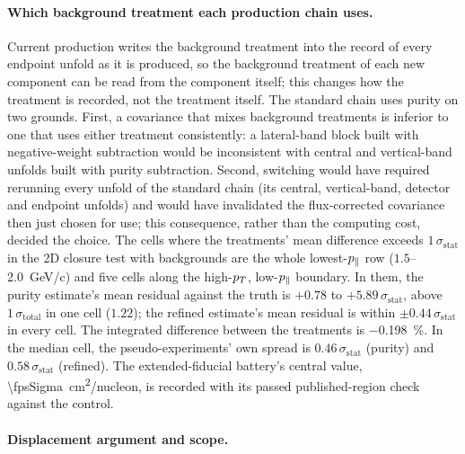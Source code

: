 \paragraph{Which background treatment each production chain uses.} Current production writes the background treatment into the record of every endpoint unfold as it is produced, so the background treatment of each new component can be read from the component itself; this changes how the treatment is recorded, not the treatment itself. The standard chain uses purity on two grounds. First, a covariance that mixes background treatments is inferior to one that uses either treatment consistently: a lateral-band block built with negative-weight subtraction would be inconsistent with central and vertical-band unfolds built with purity subtraction. Second, switching would have required rerunning every unfold of the standard chain (its central, vertical-band, detector and endpoint unfolds) and would have invalidated the flux-corrected covariance then just chosen for use; this consequence, rather than the computing cost, decided the choice. The cells where the treatments' mean difference exceeds $1\,\sigma_{\mathrm{stat}}$ in the 2D closure test with backgrounds are the whole lowest-$p_{\parallel}$ row ($1.5$--\SI{2.0}{GeV/c}) and five cells along the high-$p_{T}$, low-$p_{\parallel}$ boundary. In them, the purity estimate's mean residual against the truth is $+0.78$ to $+5.89\,\sigma_{\mathrm{stat}}$, above $1\,\sigma_{\mathrm{total}}$ in one cell ($1.22$); the refined estimate's mean residual is within $\pm0.44\,\sigma_{\mathrm{stat}}$ in every cell. The integrated difference between the treatments is \SI{-0.198}{\percent}. In the median cell, the pseudo-experiments' own spread is $0.46\,\sigma_{\mathrm{stat}}$ (purity) and $0.58\,\sigma_{\mathrm{stat}}$ (refined). The extended-fiducial battery's central value, \SI{\fpsSigma}{cm^2/nucleon}, is recorded with its passed published-region check against the control.

\paragraph{Displacement argument and scope.}

